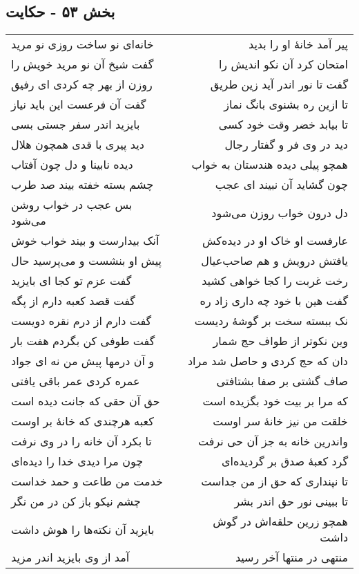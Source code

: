 \begin{center}
\section*{بخش ۵۳ - حکایت}
\label{sec:sh053}
\begin{longtable}{l p{0.5cm} r}
خانه‌ای نو ساخت روزی نو مرید
&&
پیر آمد خانهٔ او را بدید
\\
گفت شیخ آن نو مرید خویش را
&&
امتحان کرد آن نکو اندیش را
\\
روزن از بهر چه کردی ای رفیق
&&
گفت تا نور اندر آید زین طریق
\\
گفت آن فرعست این باید نیاز
&&
تا ازین ره بشنوی بانگ نماز
\\
بایزید اندر سفر جستی بسی
&&
تا بیابد خضر وقت خود کسی
\\
دید پیری با قدی همچون هلال
&&
دید در وی فر و گفتار رجال
\\
دیده نابینا و دل چون آفتاب
&&
همچو پیلی دیده هندستان به خواب
\\
چشم بسته خفته بیند صد طرب
&&
چون گشاید آن نبیند ای عجب
\\
بس عجب در خواب روشن می‌شود
&&
دل درون خواب روزن می‌شود
\\
آنک بیدارست و بیند خواب خوش
&&
عارفست او خاک او در دیده‌کش
\\
پیش او بنشست و می‌پرسید حال
&&
یافتش درویش و هم صاحب‌عیال
\\
گفت عزم تو کجا ای بایزید
&&
رخت غربت را کجا خواهی کشید
\\
گفت قصد کعبه دارم از پگه
&&
گفت هین با خود چه داری زاد ره
\\
گفت دارم از درم نقره دویست
&&
نک ببسته سخت بر گوشهٔ ردیست
\\
گفت طوفی کن بگردم هفت بار
&&
وین نکوتر از طواف حج شمار
\\
و آن درمها پیش من نه ای جواد
&&
دان که حج کردی و حاصل شد مراد
\\
عمره کردی عمر باقی یافتی
&&
صاف گشتی بر صفا بشتافتی
\\
حق آن حقی که جانت دیده است
&&
که مرا بر بیت خود بگزیده است
\\
کعبه هرچندی که خانهٔ بر اوست
&&
خلقت من نیز خانهٔ سر اوست
\\
تا بکرد آن خانه را در وی نرفت
&&
واندرین خانه به جز آن حی نرفت
\\
چون مرا دیدی خدا را دیده‌ای
&&
گرد کعبهٔ صدق بر گردیده‌ای
\\
خدمت من طاعت و حمد خداست
&&
تا نپنداری که حق از من جداست
\\
چشم نیکو باز کن در من نگر
&&
تا ببینی نور حق اندر بشر
\\
بایزید آن نکته‌ها را هوش داشت
&&
همچو زرین حلقه‌اش در گوش داشت
\\
آمد از وی بایزید اندر مزید
&&
منتهی در منتها آخر رسید
\\
\end{longtable}
\end{center}
